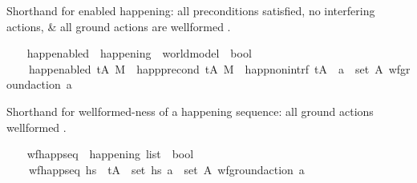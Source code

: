 \begin{isabellebody}
\begin{isamarkuptext}%
Shorthand for enabled happening: all preconditions satisfied, no interfering actions, 
    \& all ground actions are wellformed .%
\end{isamarkuptext}\isamarkuptrue%
\ \ \isamarkupfalse%
\ happ{\isacharunderscore}{\kern0pt}enabled\ {\isacharcolon}{\kern0pt}{\isacharcolon}{\kern0pt}\ {\isachardoublequoteopen}happening\ {\isasymRightarrow}\ world{\isacharunderscore}{\kern0pt}model\ {\isasymRightarrow}\ bool{\isachardoublequoteclose}\ \ \isanewline
\ \ \ \ {\isachardoublequoteopen}happ{\isacharunderscore}{\kern0pt}enabled\ {\isacharparenleft}{\kern0pt}t{\isacharcomma}{\kern0pt}A{\isacharparenright}{\kern0pt}\ M\ {\isasymlongleftrightarrow}\ {\isacharparenleft}{\kern0pt}happ{\isacharunderscore}{\kern0pt}precond\ {\isacharparenleft}{\kern0pt}t{\isacharcomma}{\kern0pt}A{\isacharparenright}{\kern0pt}\ M\ {\isasymand}\ happ{\isacharunderscore}{\kern0pt}non{\isacharunderscore}{\kern0pt}intrf\ {\isacharparenleft}{\kern0pt}t{\isacharcomma}{\kern0pt}A{\isacharparenright}{\kern0pt}\ {\isasymand}\ {\isacharparenleft}{\kern0pt}{\isasymforall}a\ {\isasymin}\ set\ A{\isachardot}{\kern0pt}\ wf{\isacharunderscore}{\kern0pt}ground{\isacharunderscore}{\kern0pt}action\ a{\isacharparenright}{\kern0pt}{\isacharparenright}{\kern0pt}{\isachardoublequoteclose}%
\begin{isamarkuptext}%
Shorthand for wellformed-ness of a happening sequence: all ground actions wellformed .%
\end{isamarkuptext}\isamarkuptrue%
\ \ \isamarkupfalse%
\ wf{\isacharunderscore}{\kern0pt}happ{\isacharunderscore}{\kern0pt}seq\ {\isacharcolon}{\kern0pt}{\isacharcolon}{\kern0pt}\ {\isachardoublequoteopen}happening\ list\ {\isasymRightarrow}\ bool{\isachardoublequoteclose}\ \isanewline
\ \ \ \ {\isachardoublequoteopen}wf{\isacharunderscore}{\kern0pt}happ{\isacharunderscore}{\kern0pt}seq\ hs\ {\isasymlongleftrightarrow}\ {\isacharparenleft}{\kern0pt}{\isasymforall}{\isacharparenleft}{\kern0pt}t{\isacharcomma}{\kern0pt}A{\isacharparenright}{\kern0pt}\ {\isasymin}\ set\ hs{\isachardot}{\kern0pt}\ {\isacharparenleft}{\kern0pt}{\isasymforall}a\ {\isasymin}\ set\ A{\isachardot}{\kern0pt}\ wf{\isacharunderscore}{\kern0pt}ground{\isacharunderscore}{\kern0pt}action\ a{\isacharparenright}{\kern0pt}{\isacharparenright}{\kern0pt}{\isachardoublequoteclose}\isanewline
\isanewline
{}\isamarkupfalse%
\ %
\end{isabellebody}
